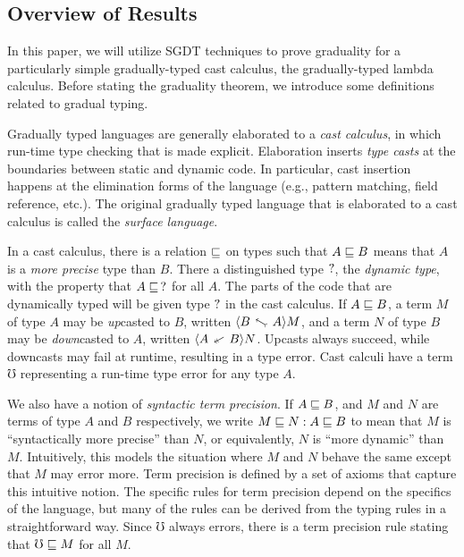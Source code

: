 \subsection{Overview of Results}\label{sec:overview}



In this paper, we will utilize SGDT techniques to prove graduality for a particularly
simple gradually-typed cast calculus, the gradually-typed lambda calculus.
Before stating the graduality theorem, we introduce some definitions related to gradual typing.

Gradually typed languages are generally elaborated to a \emph{cast calculus}, in which run-time type checking
that is made explicit. Elaboration inserts \emph{type casts} at the boundaries between static and dynamic code.
In particular, cast insertion happens at the elimination forms of the language (e.g., pattern matching, field reference, etc.).
The original gradually typed language that is elaborated to a cast calculus is called the \emph{surface language}.

In a cast calculus, there is a relation $\sqsubseteq$ on types such that $A \sqsubseteq B$ means that
$A$ is a \emph{more precise} type than $B$.
There a distinguished type $?$, the \emph{dynamic type}, with the property that $A \sqsubseteq\, ?$ for all $A$.
The parts of the code that are dynamically typed will be given type $?$ in the cast calculus.
%
If $A \sqsubseteq B$, a term $M$ of type $A$ may be \emph{up}casted to $B$, written $\up A B M$,
and a term $N$ of type $B$ may be \emph{down}casted to $A$, written $\dn A B N$.
Upcasts always succeed, while downcasts may fail at runtime, resulting in a type error.
Cast calculi have a term $\mho$ representing a run-time type error for any type $A$.

We also have a notion of \emph{syntactic term precision}.
If $A \sqsubseteq B$, and $M$ and $N$ are terms of type $A$ and $B$ respectively, we write
$M \sqsubseteq N : A \sqsubseteq B$ to mean that
$M$ is ``syntactically more precise'' than $N$, or equivalently, $N$ is 
``more dynamic'' than $M$. Intuitively, this models the situation where $M$ and $N$
behave the same except that $M$ may error more.
Term precision is defined by a set of axioms that capture this intuitive notion.
The specific rules for term precision depend on the specifics of the language, but
many of the rules can be derived from the typing rules in a straightforward way.
Since $\mho$ always errors, there is a term precision rule stating that $\mho \sqsubseteq M$ for all $M$.

